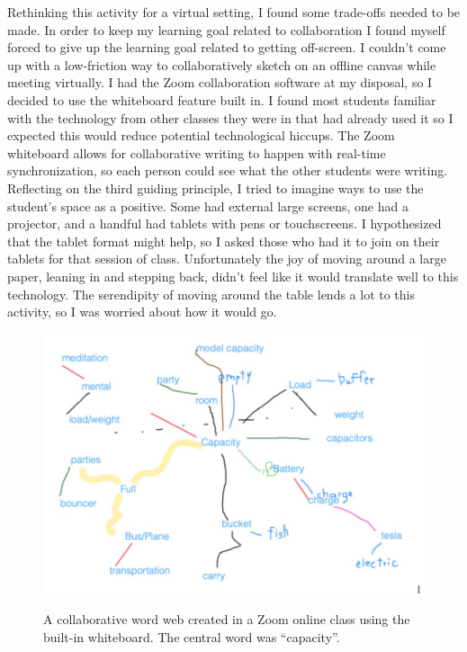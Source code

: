 \documentclass[journal]{vgtc}                %
\begin{document}
Rethinking this activity for a virtual setting, I found some trade-offs needed to be made. In order to keep my learning goal related to collaboration I found myself forced to give up the learning goal related to getting off-screen. I couldn't come up with a low-friction way to collaboratively sketch on an offline canvas while meeting virtually. I had the Zoom collaboration software at my disposal, so I decided to use the whiteboard feature built in. I found most students familiar with the technology from other classes they were in that had already used it so I expected this would reduce potential technological hiccups. The Zoom whiteboard allows for collaborative writing to happen with real-time synchronization, so each person could see what the other students were writing. Reflecting on the third guiding principle, I tried to imagine ways to use the student's space as a positive. Some had external large screens, one had a projector, and a handful had tablets with pens or touchscreens. I hypothesized that the tablet format might help, so I asked those who had it to join on their tablets for that session of class. Unfortunately the joy of moving around a large paper, leaning in and stepping back, didn't feel like it would translate well to this technology. The serendipity of moving around the table lends a lot to this activity, so I was worried about how it would go.

\begin{figure}[h]
  \centering
  \includegraphics[scale=0.28]{figures/word-web-online.jpg}
  \label{fig:word_web_online}
  \setlength{\abovecaptionskip}{-7pt}
  \caption{A collaborative word web created in a Zoom online class using the built-in whiteboard. The central word was “capacity”.}
\end{figure}
\end{document}
